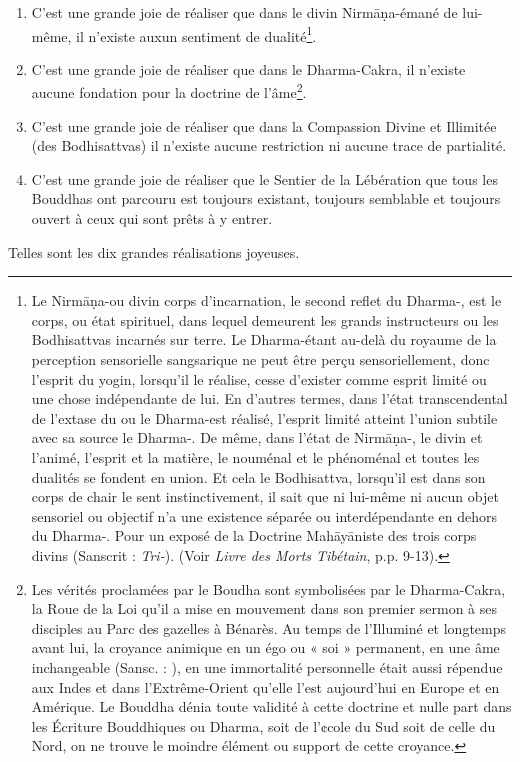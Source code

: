 \documentclass[10pt]{book}
\begin{document}
\begin{enumerate}[1.-]
\item C'est une grande joie de réaliser que dans le divin Nirmāṇa-\kaya émané de lui-même, il n'existe auxun sentiment de dualité\footnote{Le Nirmāṇa-\kaya ou divin corps d'incarnation, le second reflet du Dharma-\kaya, est le corps, ou état spirituel, dans lequel demeurent les grands instructeurs ou les Bodhisattvas incarnés sur terre. Le Dharma-\kaya étant au-delà du royaume de la perception sensorielle sangsarique ne peut être perçu sensoriellement, donc l'esprit du yogin, lorsqu'il le réalise, cesse d'exister comme esprit limité ou une chose indépendante de lui. En d'autres termes, dans l'état transcendental de l'extase du \samadhi ou le Dharma-\kaya est réalisé, l'esprit limité atteint l'union subtile avec sa source le Dharma-\kaya. De même, dans l'état de Nirmāṇa-\kaya, le divin et l'animé, l'esprit et la matière, le nouménal et le phénoménal et toutes les dualités se fondent en union. Et cela le Bodhisattva, lorsqu'il est dans son corps de chair le sent instinctivement, il sait que ni lui-même ni aucun objet sensoriel ou objectif n'a une existence séparée ou interdépendante en dehors du Dharma-\kaya. Pour un exposé de la Doctrine Mahāyāniste des trois corps divins (Sanscrit : \textit{Tri-\kaya}). (Voir \textit{Livre des Morts Tibétain}, p.p. 9-13).}.
\item C'est une grande joie de réaliser que dans le Dharma-Cakra, il n'existe aucune fondation pour la doctrine de l'âme\footnote{Les vérités proclamées par le Boudha sont symbolisées par le Dharma-Cakra, la Roue de la Loi qu'il a mise en mouvement dans son premier sermon à ses disciples au Parc des gazelles à Bénarès. Au temps de l'Illuminé et longtemps avant lui, la croyance animique en un égo ou « soi » permanent, en une âme inchangeable (Sansc. : \textit{\atman}), en une immortalité personnelle était aussi répendue aux Indes et dans l'Extrême-Orient qu'elle l'est aujourd'hui en Europe et en Amérique. Le Bouddha dénia toute validité à cette doctrine et nulle part dans les Écriture Bouddhiques ou Dharma, soit de l'¢cole du Sud soit de celle du Nord, on ne trouve le moindre élément ou support de cette croyance.}.
\item C'est une grande joie de réaliser que dans la Compassion Divine et Illimitée (des Bodhisattvas) il n'existe aucune restriction ni aucune trace de partialité.
\item C'est une grande joie de réaliser que le Sentier de la Lébération que tous les Bouddhas ont parcouru est toujours existant, toujours semblable et toujours ouvert à ceux qui sont prêts à y entrer.
\end{enumerate}
Telles sont les dix grandes réalisations joyeuses.
\end{document}
